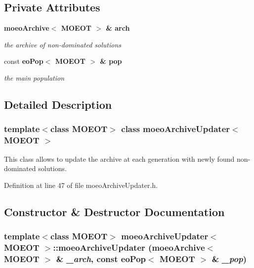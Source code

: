 \subsection*{Private Attributes}
\begin{CompactItemize}
\item 
\bf{moeo\-Archive}$<$ MOEOT $>$ \& \bf{arch}\label{classmoeoArchiveUpdater_64531e46898b0e2a4ec48ba28dbfd59d}

\begin{CompactList}\small\item\em the archive of non-dominated solutions \item\end{CompactList}\item 
const \bf{eo\-Pop}$<$ MOEOT $>$ \& \bf{pop}\label{classmoeoArchiveUpdater_a7ba8cde3727d1f24835083e85dfd70d}

\begin{CompactList}\small\item\em the main population \item\end{CompactList}\end{CompactItemize}


\subsection{Detailed Description}
\subsubsection*{template$<$class MOEOT$>$ class moeo\-Archive\-Updater$<$ MOEOT $>$}

This class allows to update the archive at each generation with newly found non-dominated solutions. 



Definition at line 47 of file moeo\-Archive\-Updater.h.

\subsection{Constructor \& Destructor Documentation}
\subsubsection{\setlength{\rightskip}{0pt plus 5cm}template$<$class MOEOT$>$ \bf{moeo\-Archive\-Updater}$<$ MOEOT $>$::\bf{moeo\-Archive\-Updater} (\bf{moeo\-Archive}$<$ MOEOT $>$ \& {\em \_\-arch}, const \bf{eo\-Pop}$<$ MOEOT $>$ \& {\em \_\-pop})\hspace{0.3cm}{\tt  [inline]}}\label{classmoeoArchiveUpdater_1497a2bc8df12565b3ea21bb8e08bee1}



